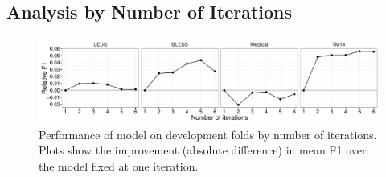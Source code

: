 \subsection{Analysis by Number of Iterations}

\begin{figure}
  \begin{center}
  \includegraphics[width=1.00\textwidth]{plots/hpmbyiter}
\end{center}
\caption{Performance of model on development folds by number of iterations. Plots
show the improvement (absolute difference) in mean F1 over the model fixed at one
iteration.}
\label{fig:byiteration}
\end{figure}

